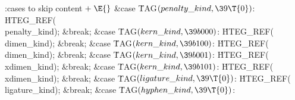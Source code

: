 
\Y\B\4:cases to skip content\X${}\mathrel+\E{}$\6
\4\&{case} \.{TAG}${}(\index{penalty kind+\\{penalty\_kind}}\\{penalty\_kind},\39\T{0}){}$:\5
\.{HTEG\_REF}(\\{penalty\_kind});\5
\&{break};\6
\4\&{case} \.{TAG}${}(\index{kern kind+\\{kern\_kind}}\\{kern\_kind},\39\\{b000}){}$:\5
\.{HTEG\_REF}(\\{dimen\_kind});\5
\&{break};\6
\4\&{case} \.{TAG}${}(\index{kern kind+\\{kern\_kind}}\\{kern\_kind},\39\\{b100}){}$:\5
\.{HTEG\_REF}(\\{dimen\_kind});\5
\&{break};\6
\4\&{case} \.{TAG}${}(\index{kern kind+\\{kern\_kind}}\\{kern\_kind},\39\\{b001}){}$:\5
\.{HTEG\_REF}(\\{xdimen\_kind});\5
\&{break};\6
\4\&{case} \.{TAG}${}(\index{kern kind+\\{kern\_kind}}\\{kern\_kind},\39\\{b101}){}$:\5
\.{HTEG\_REF}(\\{xdimen\_kind});\5
\&{break};\6
\4\&{case} \.{TAG}${}(\index{ligature kind+\\{ligature\_kind}}\\{ligature\_kind},\39\T{0}){}$:\5
\.{HTEG\_REF}(\\{ligature\_kind});\5
\&{break};\6
\4\&{case} \.{TAG}${}(\index{hyphen kind+\\{hyphen\_kind}}\\{hyphen\_kind},\39\T{0}){}$:\5
